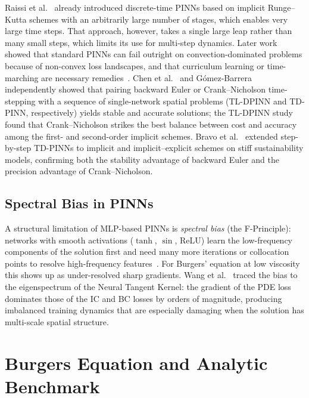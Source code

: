 Raissi et al.~\cite{Raissi2019} already introduced discrete-time PINNs based on
implicit Runge--Kutta schemes with an arbitrarily large number of stages,
which enables very large time steps. That approach, however, takes a single
large leap rather than many small steps, which limits its use for multi-step
dynamics. Later work showed that standard PINNs can fail outright on
convection-dominated problems because of non-convex loss landscapes, and that
curriculum learning or time-marching are necessary
remedies~\cite{Krishnapriyan2021,Daw2023}. Chen et al.~\cite{Chen2023} and
Gómez-Barrera~\cite{pipe} independently showed that pairing backward Euler or
Crank--Nicholson time-stepping with a sequence of single-network spatial
problems (TL-DPINN and TD-PINN, respectively) yields stable and accurate
solutions; the TL-DPINN study found that Crank--Nicholson strikes the best
balance between cost and accuracy among the first- and second-order implicit
schemes. Bravo et al.~\cite{Bravo2024} extended step-by-step TD-PINNs to
implicit and implicit--explicit schemes on stiff sustainability models,
confirming both the stability advantage of backward Euler and the precision
advantage of Crank--Nicholson.

\subsection{Spectral Bias in PINNs}

A structural limitation of MLP-based PINNs is \emph{spectral bias} (the
F-Principle): networks with smooth activations ($\tanh$, $\sin$, ReLU) learn
the low-frequency components of the solution first and need many more
iterations or collocation points to resolve high-frequency
features~\cite{Rahaman2019}. For Burgers' equation at low viscosity this shows
up as under-resolved sharp gradients. Wang et al.~\cite{Wang2021} traced the
bias to the eigenspectrum of the Neural Tangent Kernel: the gradient of the
PDE loss dominates those of the IC and BC losses by orders of magnitude,
producing imbalanced training dynamics that are especially damaging when the
solution has multi-scale spatial structure.

\section{Burgers Equation and Analytic Benchmark}

